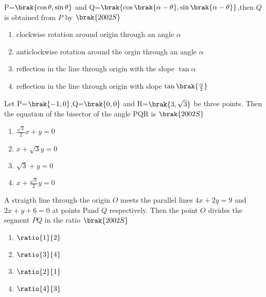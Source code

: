 P=$\brak{\cos\theta,\sin\theta}$ and Q=$\brak{\cos\brak{\alpha-\theta},\sin\brak{\alpha-\theta}}$,then $Q$ is obtained from $P$ by
\hfill{$\brak{2002S}$}
\begin{enumerate}
    \item clockwise rotation around origin through an angle $\alpha$
    \item anticlockwise rotation around the orgin through an angle $\alpha$
    \item reflection in the line through origin with the slope $\tan\alpha$
    \item reflection in the line through origin with slope $\tan\brak{\frac{\alpha}{2}}$
\end{enumerate}
\item Let P=$\brak{-1,0}$,Q=$\brak{0,0}$ and R=$\brak{3,\sqrt{3}}$ be three points. Then the equation of the bisector of the angle PQR is 
\hfill{$\brak{2002S}$}
\begin{enumerate}
    
        \item $\frac{\sqrt{3}}{2}x+y=0$
        \item $x+\sqrt{3}y=0$
        \item $\sqrt{3}+y=0$
        \item $x+\frac{\sqrt{3}}{2}y=0$
    
\end{enumerate}
\item A straigth line through the origin $O$ meets the parallel lines $4x+2y=9$ and $2x+y+6=0$ at points Pand $Q$ respectively. Then the point $O$ divides the segment $PQ$ in the ratio 
\hfill{$\brak{2002S}$}
\begin{enumerate}

     \item $\ratio{1}{2}$
     \item $\ratio{3}{4}$
     \item $\ratio{2}{1}$
     \item $\ratio{4}{3}$

\end{enumerate}


